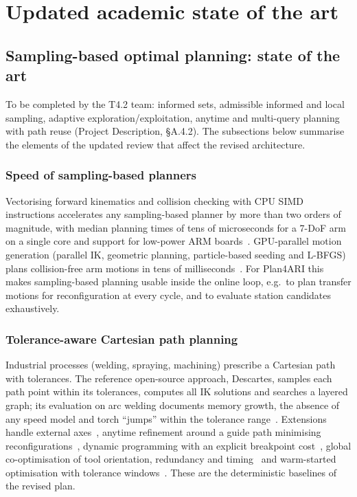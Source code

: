 \documentclass{plan4ari_report}
\begin{document}
\section{Updated academic state of the art}
\label{sec:sota}

\subsection{Sampling-based optimal planning: state of the art}\label{sec:sbp}

\begin{planbox}
To be completed by the T4.2 team: informed sets, admissible informed and local sampling, adaptive exploration/exploitation, anytime and multi-query planning with path reuse (Project Description, \S A.4.2). The subsections below summarise the elements of the updated review that affect the revised architecture.
\end{planbox}

\subsubsection{Speed of sampling-based planners}
Vectorising forward kinematics and collision checking with CPU SIMD instructions accelerates any sampling-based planner by more than two orders of magnitude, with median planning times of tens of microseconds for a 7-DoF arm on a single core and support for low-power ARM boards~\cite{thomason2024vamp}. GPU-parallel motion generation (parallel IK, geometric planning, particle-based seeding and L-BFGS) plans collision-free arm motions in tens of milliseconds~\cite{sundaralingam2023curobo}. For Plan4ARI this makes sampling-based planning usable inside the online loop, e.g.\ to plan transfer motions for reconfiguration at every cycle, and to evaluate station candidates exhaustively.

\subsubsection{Tolerance-aware Cartesian path planning}
Industrial processes (welding, spraying, machining) prescribe a Cartesian path with tolerances. The reference open-source approach, Descartes, samples each path point within its tolerances, computes all IK solutions and searches a layered graph; its evaluation on arc welding documents memory growth, the absence of any speed model and torch ``jumps'' within the tolerance range~\cite{demaeyer2017descartes}. Extensions handle external axes~\cite{sun2020externalaxis}, anytime refinement around a guide path minimising reconfigurations~\cite{wang2025anytimetracking}, dynamic programming with an explicit breakpoint cost~\cite{yin2024dpbreakpoints}, global co-optimisation of tool orientation, redundancy and timing~\cite{chen2025cooptimization} and warm-started optimisation with tolerance windows~\cite{weingartshofer2023pathframework}. These are the deterministic baselines of the revised plan.
\end{document}
